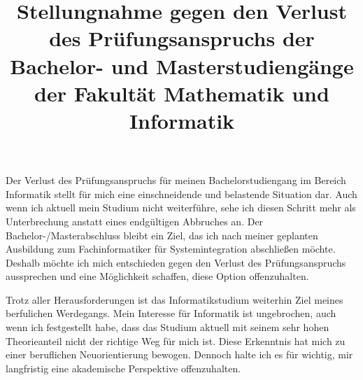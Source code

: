\documentclass[a4paper,12pt]{article}
\title{Stellungnahme gegen den Verlust des Prüfungsanspruchs der Bachelor- und Masterstudiengänge der Fakultät Mathematik und Informatik}
\begin{document}
\maketitle

Der Verlust des Prüfungsanspruchs für meinen Bachelorstudiengang im Bereich Informatik stellt für mich eine einschneidende und belastende Situation dar.
Auch wenn ich aktuell mein Studium nicht weiterführe, sehe ich diesen Schritt mehr als Unterbrechung anstatt eines endgültigen Abbruches an.
Der Bachelor-/Masterabschluss bleibt ein Ziel, das ich nach meiner geplanten Ausbildung zum Fachinformatiker für Systemintegration abschließen möchte.
Deshalb möchte ich mich entschieden gegen den Verlust des Prüfungsanspruchs aussprechen und eine Möglichkeit schaffen, diese Option offenzuhalten.

Trotz aller Herausforderungen ist das Informatikstudium weiterhin Ziel meines berfulichen Werdegangs.
Mein Interesse für Informatik ist ungebrochen, auch wenn ich festgestellt habe, dass das Studium aktuell mit seinem sehr hohen Theorieanteil nicht der richtige Weg für mich ist.
Diese Erkenntnis hat mich zu einer beruflichen Neuorientierung bewogen.
Dennoch halte ich es für wichtig, mir langfristig eine akademische Perspektive offenzuhalten.
\\
\end{document}
